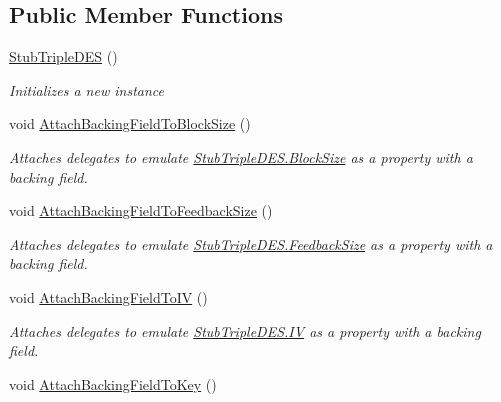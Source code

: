 \subsection*{Public Member Functions}
\begin{DoxyCompactItemize}
\item 
\hyperlink{class_system_1_1_security_1_1_cryptography_1_1_fakes_1_1_stub_triple_d_e_s_accd28691735d5b268ee5e5b6759b4980}{Stub\-Triple\-D\-E\-S} ()
\begin{DoxyCompactList}\small\item\em Initializes a new instance\end{DoxyCompactList}\item 
void \hyperlink{class_system_1_1_security_1_1_cryptography_1_1_fakes_1_1_stub_triple_d_e_s_a3b368352c797c6dc9026d9c84190bf3b}{Attach\-Backing\-Field\-To\-Block\-Size} ()
\begin{DoxyCompactList}\small\item\em Attaches delegates to emulate \hyperlink{class_system_1_1_security_1_1_cryptography_1_1_fakes_1_1_stub_triple_d_e_s_a75dce7791e1555782e120c0d6c229484}{Stub\-Triple\-D\-E\-S.\-Block\-Size} as a property with a backing field.\end{DoxyCompactList}\item 
void \hyperlink{class_system_1_1_security_1_1_cryptography_1_1_fakes_1_1_stub_triple_d_e_s_ac500963bcf8eb99ea8a6611cd468bafe}{Attach\-Backing\-Field\-To\-Feedback\-Size} ()
\begin{DoxyCompactList}\small\item\em Attaches delegates to emulate \hyperlink{class_system_1_1_security_1_1_cryptography_1_1_fakes_1_1_stub_triple_d_e_s_aa307c2c7e02a7c9f179b4d5b7a215f20}{Stub\-Triple\-D\-E\-S.\-Feedback\-Size} as a property with a backing field.\end{DoxyCompactList}\item 
void \hyperlink{class_system_1_1_security_1_1_cryptography_1_1_fakes_1_1_stub_triple_d_e_s_a33493c12e3a3fa1743ad8f0d63b2ad9e}{Attach\-Backing\-Field\-To\-I\-V} ()
\begin{DoxyCompactList}\small\item\em Attaches delegates to emulate \hyperlink{class_system_1_1_security_1_1_cryptography_1_1_fakes_1_1_stub_triple_d_e_s_a801318e49117071672acd4011536e15f}{Stub\-Triple\-D\-E\-S.\-I\-V} as a property with a backing field.\end{DoxyCompactList}\item 
void \hyperlink{class_system_1_1_security_1_1_cryptography_1_1_fakes_1_1_stub_triple_d_e_s_a7d4bc36f0504c92cbe5c6c25d90d0a34}{Attach\-Backing\-Field\-To\-Key} ()

\end{DoxyCompactItemize}
